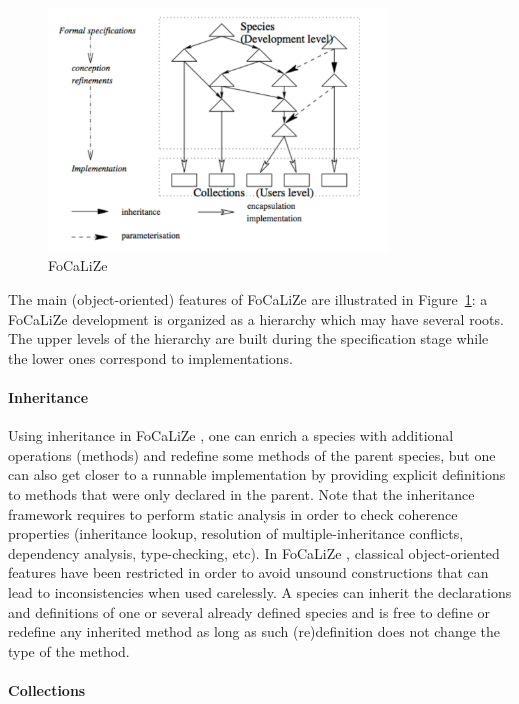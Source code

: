 \documentclass[submission,copyright,creativecommons]{eptcs}
\def\focalize{FoCaLiZe \mbox{}}
\begin{document}
\begin{figure}
  \begin{center}
    \includegraphics[width=9cm]{GFocal.pdf}
    \caption{\focalize}
    \label{fig:focal}
  \end{center}
\end{figure}

The main (object-oriented) features of \focalize are illustrated in
Figure~\ref{fig:focal}: a \focalize development is organized as a
hierarchy which may have several roots.
The upper levels of the hierarchy are built during the specification
stage while the lower ones correspond to implementations.

\paragraph{Inheritance}
Using inheritance in \focalize, one can
enrich a species with additional operations (methods) and
redefine some methods of the parent species, but one can also get
closer to a runnable implementation by providing explicit definitions to methods
that were only declared in the parent.
Note that the inheritance framework requires to perform static analysis in order
to check coherence properties (inheritance lookup, resolution of 
multiple-inheritance conflicts, dependency analysis, type-checking,
etc).
In \focalize, classical object-oriented features have been restricted
in order to
avoid unsound constructions that can lead to inconsistencies when used
carelessly.
A species can
inherit the declarations and definitions of one or several already
defined species and is
free to define or
redefine any inherited method as long as such (re)definition does not
change the type of the method.

\paragraph{Collections}
\end{document}
